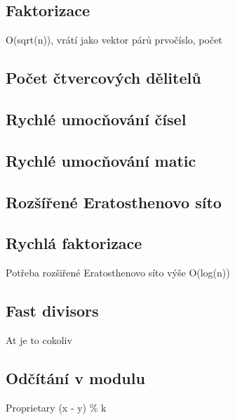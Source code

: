 \documentclass[10pt, a4paper]{article}
\begin{document}
\subsection{Faktorizace}
O(sqrt(n)), vrátí jako vektor párů {prvočíslo, počet}


\subsection{Počet čtvercových dělitelů}


\subsection{Rychlé umocňování čísel}



\subsection{Rychlé umocňování matic}


\subsection{Rozšířené Eratosthenovo síto}


\subsection{Rychlá faktorizace}
Potřeba rozšiřené Eratosthenovo síto výše
O(log(n))


\subsection{Fast divisors}
At je to cokoliv


\subsection{Odčítání v modulu}
Proprietary (x - y) \% k

\end{document}
